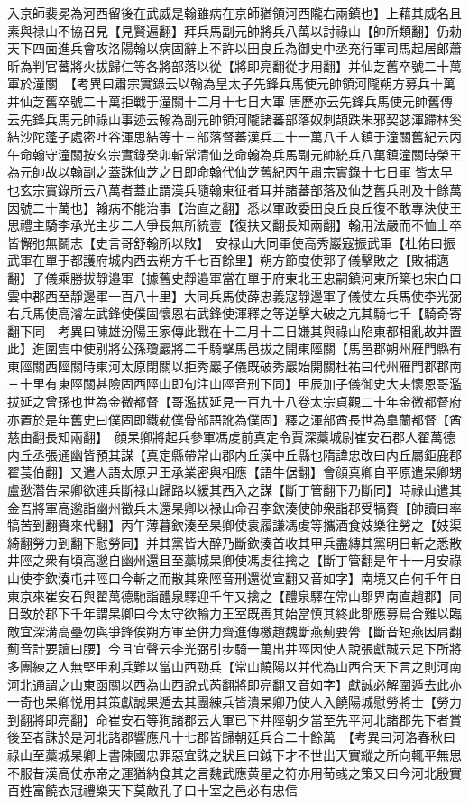 入京師裴冕為河西留後在武威是翰雖病在京師猶領河西隴右兩鎮也】上藉其威名且素與禄山不協召見【見賢遍翻】拜兵馬副元帥將兵八萬以討祿山【帥所類翻】仍勑天下四面進兵會攻洛陽翰以病固辭上不許以田良丘為御史中丞充行軍司馬起居郎蕭昕為判官蕃將火拔歸仁等各將部落以從【將即亮翻從才用翻】并仙芝舊卒號二十萬軍於潼關　【考異曰肅宗實錄云以翰為皇太子先鋒兵馬使元帥領河隴朔方募兵十萬并仙芝舊卒號二十萬拒戰于潼關十二月十七日大軍唐歷亦云先鋒兵馬使元帥舊傳云先鋒兵馬元帥祿山事迹云翰為副元帥領河隴諸蕃部落奴刺頡跌朱邪契苾渾蹛林奚結沙陀蓬子處密吐谷渾思結等十三部落督蕃漢兵二十一萬八千人鎮于潼關舊紀云丙午命翰守潼關按玄宗實錄癸卯斬常清仙芝命翰為兵馬副元帥統兵八萬鎮潼關時榮王為元帥故以翰副之蓋誅仙芝之日即命翰代仙芝舊紀丙午肅宗實錄十七日軍皆太早也玄宗實錄所云八萬者蓋止謂漢兵隨翰東征者耳并諸蕃部落及仙芝舊兵則及十餘萬因號二十萬也】翰病不能治事【治直之翻】悉以軍政委田良丘良丘復不敢專決使王思禮主騎李承光主步二人爭長無所統壹【復扶又翻長知兩翻】翰用法嚴而不恤士卒皆懈弛無鬬志【史言哥舒翰所以敗】　安禄山大同軍使高秀巖寇振武軍【杜佑曰振武軍在單于都護府城内西去朔方千七百餘里】朔方節度使郭子儀擊敗之【敗補邁翻】子儀乘勝拔靜邉軍【據舊史靜邉軍當在單于府東北王忠嗣鎮河東所築也宋白曰雲中郡西至靜邊軍一百八十里】大同兵馬使薛忠義寇靜邊軍子儀使左兵馬使李光弼右兵馬使高濬左武鋒使僕固懷恩右武鋒使渾釋之等逆擊大破之亢其騎七千【騎奇寄翻下同　考異曰陳雄汾陽王家傳此戰在十二月十二日嫌其與祿山陷東都相亂故并置此】進圍雲中使别將公孫瓊巖將二千騎擊馬邑拔之開東陘關【馬邑郡朔州雁門縣有東陘關西陘關時東河太原閉關以拒秀巖子儀既破秀巖始開關杜祐曰代州雁門郡郡南三十里有東陘關甚險固西陘山即句注山陘音刑下同】甲辰加子儀御史大夫懷恩哥濫拔延之曾孫也世為金微都督【哥濫拔延見一百九十八卷太宗貞觀二十年金微都督府亦置於是年舊史曰僕固即鐵勒僕骨部語訛為僕固】釋之渾部酋長世為臯蘭都督【酋慈由翻長知兩翻】　顔杲卿將起兵參軍馮䖍前真定令賈深藁城尉崔安石郡人翟萬德内丘丞張通幽皆預其謀【真定縣帶常山郡内丘漢中丘縣也隋諱忠改曰内丘屬鉅鹿郡翟萇伯翻】又遣人語太原尹王承業密與相應【語牛倨翻】會顔真卿自平原遣杲卿甥盧逖濳告杲卿欲連兵斷禄山歸路以緩其西入之謀【斷丁管翻下乃斷同】時祿山遣其金吾將軍高邈詣幽州徵兵未還杲卿以禄山命召李欽湊使帥衆詣郡受犒賚【帥讀曰率犒苦到翻賚來代翻】丙午薄暮欽湊至杲卿使袁履謙馮䖍等攜酒食妓樂往勞之【妓渠綺翻勞力到翻下慰勞同】并其黨皆大醉乃斷欽湊首收其甲兵盡縳其黨明日斬之悉散井陘之衆有頃高邈自幽州還且至藁城杲卿使馮䖍往擒之【斷丁管翻是年十一月安祿山使李欽湊屯井陘口今斬之而散其衆陘音刑還從宣翻又音如字】南境又白何千年自東京來崔安石與翟萬德馳詣醴泉驛迎千年又擒之【醴泉驛在常山郡界南直趙郡】同日致於郡下千年謂杲卿曰今太守欲輸力王室既善其始當慎其終此郡應募烏合難以臨敵宜深溝高壘勿與爭鋒俟朔方軍至併力齊進傳檄趙魏斷燕薊要膂【斷音短燕因肩翻薊音計要讀曰腰】今且宜聲云李光弼引步騎一萬出井陘因使人說張獻誠云足下所將多團練之人無堅甲利兵難以當山西勁兵【常山饒陽以并代為山西合天下言之則河南河北通謂之山東函關以西為山西說式芮翻將即亮翻又音如字】獻誠必解圍遁去此亦一奇也杲卿悦用其策獻誠果遁去其團練兵皆潰杲卿乃使人入饒陽城慰勞將士【勞力到翻將即亮翻】命崔安石等狥諸郡云大軍已下井陘朝夕當至先平河北諸郡先下者賞後至者誅於是河北諸郡響應凡十七郡皆歸朝廷兵合二十餘萬　【考異曰河洛春秋曰祿山至藁城杲卿上書陳國忠罪惡宜誅之狀且曰鉞下才不世出天實縱之所向輒平無思不服昔漢高仗赤帝之運猶納食其之言魏武應黄星之符亦用荀彧之策又曰今河北殷實百姓富饒衣冠禮樂天下莫敵孔子曰十室之邑必有忠信